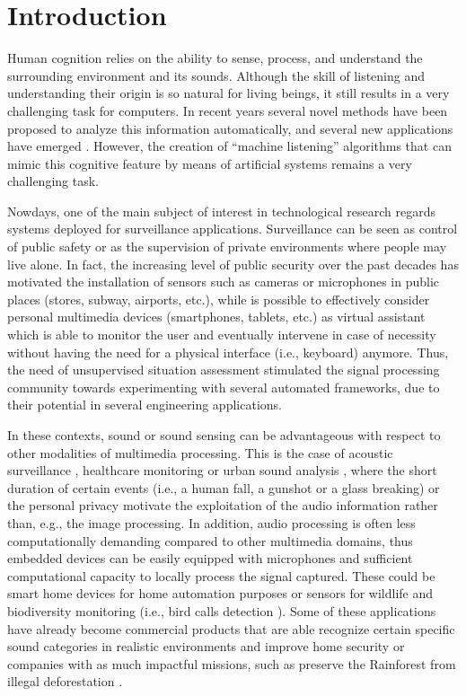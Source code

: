 \chapter{Introduction}\label{ch:intro}

Human cognition relies on the ability to sense, process, and understand the surrounding environment and its sounds.
Although the skill of listening and understanding their origin is so natural for living beings, it still results in a very challenging task for computers. In recent years several novel methods have been proposed to analyze this information automatically, and several new applications have emerged \cite{virtanen2018computational}. However, the creation of ``machine listening'' algorithms that can mimic this cognitive feature by means of artificial systems remains a very challenging task. 

Nowdays, one of the main subject of interest in technological research regards systems deployed for surveillance applications. Surveillance can be seen as control of public safety or as the supervision of private environments where people may live alone. 
In fact, the increasing level of public security over the past decades has motivated the installation of sensors such as cameras or microphones in public places (stores, subway, airports, etc.), while is possible to effectively consider personal multimedia devices (smartphones, tablets, etc.) as virtual assistant which is able to monitor the user and eventually intervene in case of necessity without having the need for a physical interface (i.e., keyboard) anymore.
Thus, the need of unsupervised situation assessment stimulated the signal processing community towards experimenting with several automated frameworks, due to their potential in several engineering applications.

In these contexts, sound or sound sensing can be advantageous with respect to other modalities of multimedia processing.  
This is the case of acoustic surveillance \cite{crocco2016audio}, healthcare monitoring \cite{peng2009healthcare, foggia2015reliable} or urban sound analysis \cite{salamon2017deep}, where the short duration of certain events (i.e., a human fall, a gunshot or a glass breaking) or the personal privacy motivate the exploitation of the audio information rather than, e.g., the image processing. 
In addition, audio processing is often less computationally demanding compared to other multimedia domains, thus embedded devices can be easily equipped with microphones and sufficient computational capacity to locally process the signal captured. 
These could be smart home devices for home automation purposes or sensors for wildlife and biodiversity monitoring (i.e., bird calls detection \cite{grill2017two}). 
Some of these applications have already become commercial products that are able recognize certain specific sound categories in realistic environments and improve home security \cite{audioanalytic}  or companies with as much impactful missions, such as preserve the Rainforest from illegal deforestation \cite{rainforest}.


